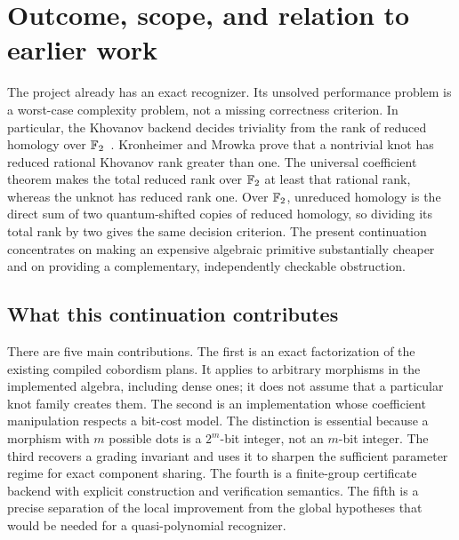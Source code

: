 \section{Outcome, scope, and relation to earlier work}
\label{sec:overview}

The project already has an exact recognizer. Its unsolved performance
problem is a worst-case complexity problem, not a missing correctness
criterion. In particular, the Khovanov backend decides triviality from the
rank of reduced homology over $\mathbb F_2$~\cite{kronheimer,shumakovitch}.
Kronheimer and Mrowka prove that a nontrivial knot has reduced rational
Khovanov rank greater than one. The universal coefficient theorem makes
the total reduced rank over $\mathbb F_2$ at least that rational rank, whereas the
unknot has reduced rank one. Over $\mathbb F_2$, unreduced homology is the direct
sum of two quantum-shifted copies of reduced homology, so dividing its
total rank by two gives the same decision criterion.
The present continuation concentrates
on making an expensive algebraic primitive substantially cheaper and on
providing a complementary, independently checkable obstruction.

\subsection{What this continuation contributes}

There are five main contributions. The first is an exact factorization of
the existing compiled cobordism plans. It applies to arbitrary morphisms in
the implemented algebra, including dense ones; it does not assume that a
particular knot family creates them. The second is an implementation whose
coefficient manipulation respects a bit-cost model. The distinction is
essential because a morphism with $m$ possible dots is a $2^m$-bit integer,
not an $m$-bit integer. The third recovers a grading invariant and uses it
to sharpen the sufficient parameter regime for exact component sharing.
The fourth is a finite-group certificate backend with
explicit construction and verification semantics. The fifth is a precise
separation of the local improvement from the global hypotheses that would
be needed for a quasi-polynomial recognizer.

